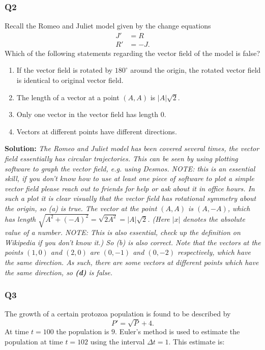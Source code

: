 \documentclass[a4paper,12pt]{article}
\begin{document}
\subsubsection*{Q2}
Recall the Romeo and Juliet model given by the change equations
\begin{align*}
	J' &= R \\
	R' &= -J.
\end{align*}
Which of the following statements regarding the vector field of the model is false?
\begin{enumerate}[label=(\alph*)]
\item If the vector field is rotated by $180^{\circ}$ around the origin, the rotated vector field is identical to original vector field.
\item The length of a vector at a point $(A,A)$ is $|A|\sqrt{2}$.
\item Only one vector in the vector field has length $0$.
\item Vectors at different points have different directions.
\end{enumerate}
\textbf{Solution: } \emph{The Romeo and Juliet model has been covered several times, the vector field essentially has circular trajectories. This can be seen by using plotting software to graph the vector field, e.g. using Desmos. NOTE: this is an essential skill, if you don't know how to use at least one piece of software to plot a simple vector field please reach out to friends for help or ask about it in office hours. In such a plot it is clear visually that the vector field has rotational symmetry about the origin, so (a) is true. The vector at the point $(A,A)$ is $(A,-A)$, which has length $\sqrt{A^2 + (-A)^2} = \sqrt{2A^2} = |A|\sqrt{2}$. (Here $|x|$ denotes the absolute value of a number. NOTE: This is also essential, check up the definition on Wikipedia if you don't know it.) So (b) is also correct. Note that the vectors at the points $(1,0)$ and $(2,0)$ are $(0,-1)$ and $(0,-2)$ respectively, which have the same direction. As such, there are some vectors at different points which have the same direction, so \textbf{(d)} is false.}
\subsubsection*{Q3}
The growth of a certain protozoa population is found to be described by
\[
	P' = \sqrt{P} + 4.
\]
At time $t=100$ the population is $9$. Euler's method is used to estimate the population at time $t=102$ using the interval $\Delta t = 1$. This estimate is:
\end{document}
